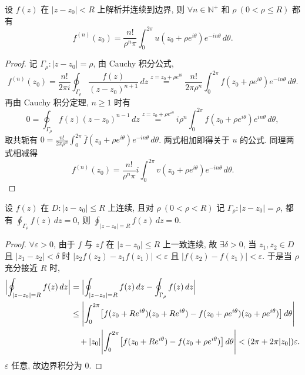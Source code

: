 \documentclass[theorem=false,mathfont=none,openany,sub3section]{easybook}
\begin{document}
\begin{example}
  设 $f(z)$ 在 $|z-z_{0}|<R$ 上解析并连续到边界, 则
  $\forall n\in\mathbb{N}^{+}$ 和 $\rho\ (0<\rho\leq R)$ 都有
  \[
  f^{(n)}(z_{0})=\frac{n!}{\rho^{n}\pi}\int_{0}^{2\pi}u(z_{0}+\rho e^{i\theta})e^{-in\theta}\,d\theta.
  \]
  \begin{proof}
    记 $\Gamma_{\rho}:|z-z_{0}|=\rho$, 由 Cauchy 积分公式,
    \[
    f^{(n)}(z_{0})=\frac{n!}{2\pi i}\oint_{\Gamma_{\rho}}\frac{f(z)}{(z-z_{0})^{n+1}}\,dz
    \stackrel{z=z_{0}+\rho e^{i\theta}}{=}\frac{n!}{2\pi\rho^{n}}\int_{0}^{2\pi}f(z_{0}+\rho e^{i\theta})e^{-in\theta}\,d\theta.
    \]
    再由 Cauchy 积分定理, $n\geq1$ 时有
    \[
    0=\oint_{\Gamma_{\rho}}f(z)(z-z_{0})^{n-1}\,dz
    \stackrel{z=z_{0}+\rho e^{i\theta}}{=}i\rho^{n}\int_{0}^{2\pi}f(z_{0}+\rho e^{i\theta})e^{in\theta}\,d\theta,
    \]
    取共轭有 $0=\frac{n!}{2\pi\rho^{n}}\int_{0}^{2\pi}\overline{f}(z_{0}+\rho e^{i\theta})e^{-in\theta}\,d\theta$.
    两式相加即得关于 $u$ 的公式. 同理两式相减得
    \[
    f^{(n)}(z_{0})=\frac{n!}{\rho^{n}\pi}i\int_{0}^{2\pi}v(z_{0}+\rho e^{i\theta})e^{-in\theta}\,d\theta.
    \]
  \end{proof}
\end{example}

\begin{example}
  设 $f(z)$ 在 $D:|z-z_{0}|\leq R$ 上连续, 且对 $\rho\ (0<\rho<R)$ 记 $\Gamma_{\rho}:|z-z_{0}|=\rho$, 都有 $\oint_{\Gamma_{\rho}}f(z)\,dz=0$, 则 $\oint_{|z-z_{0}|=R}f(z)\,dz=0$.
  \begin{proof}
    $\forall\varepsilon>0$, 由于 $f$ 与 $zf$ 在 $|z-z_{0}|\leq R$ 上一致连续, 故 $\exists\delta>0$,
    当 $z_{1},z_{2}\in D$ 且 $|z_{1}-z_{2}|<\delta$ 时 $|z_{2}f(z_{2})-z_{1}f(z_{1})|<\varepsilon$ 且 $|f(z_{2})-f(z_{1})|<\varepsilon$.
    于是当 $\rho$ 充分接近 $R$ 时,
    \[
    \begin{aligned}
    \Bigl|\oint_{|z-z_{0}|=R}f(z)\,dz\Bigr|
    &=\Bigl|\oint_{|z-z_{0}|=R}f(z)\,dz-\oint_{\Gamma_{\rho}}f(z)\,dz\Bigr|\\
    &\leq\Biggl|\int_{0}^{2\pi}\bigl[f(z_{0}+Re^{i\theta})(z_{0}+Re^{i\theta})
    -f(z_{0}+\rho e^{i\theta})(z_{0}+\rho e^{i\theta})\bigr]\,d\theta\Biggr|\\
    &\quad+|z_{0}|\Biggl|\int_{0}^{2\pi}\bigl[f(z_{0}+Re^{i\theta})-f(z_{0}+\rho e^{i\theta})\bigr]\,d\theta\Biggr|
    <(2\pi+2\pi|z_{0}|)\varepsilon.
    \end{aligned}
    \]
    $\varepsilon$ 任意, 故边界积分为 $0$.
  \end{proof}
\end{example}
\end{document}

